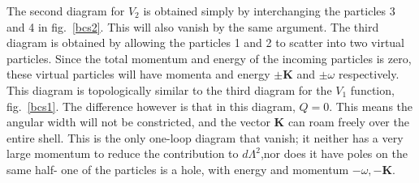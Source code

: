 \documentclass[14pt]{extarticle}
\begin{document}
\begin{minipage}{280pt}
	The second diagram for \(V_2\) is obtained simply by interchanging the particles 3 and 4 in fig.~\ref{bcs2}. This will also vanish by the same argument. The third diagram is obtained by allowing the particles 1 and 2 to scatter into two virtual particles. Since the total momentum and energy of the incoming particles is zero, these virtual particles will have momenta and energy \(\pm \mathbf{K}\) and \(\pm \omega\) respectively. This diagram is topologically similar to the third diagram for the \(V_1\) function, fig.~\ref{bcs1}. The difference however is that in this diagram, \(Q=0\). This means the angular width will not be constricted, and the vector \(\mathbf{K}\) can roam freely over the entire shell. This is the only one-loop diagram that vanish; it neither has a very large momentum to reduce the contribution to \(d\Lambda^2\),nor does it have poles on the same half- one of the particles is a hole, with energy and momentum \(-\omega,-\mathbf{K}\).
\end{minipage}
\hspace*{20pt}
\end{document}
